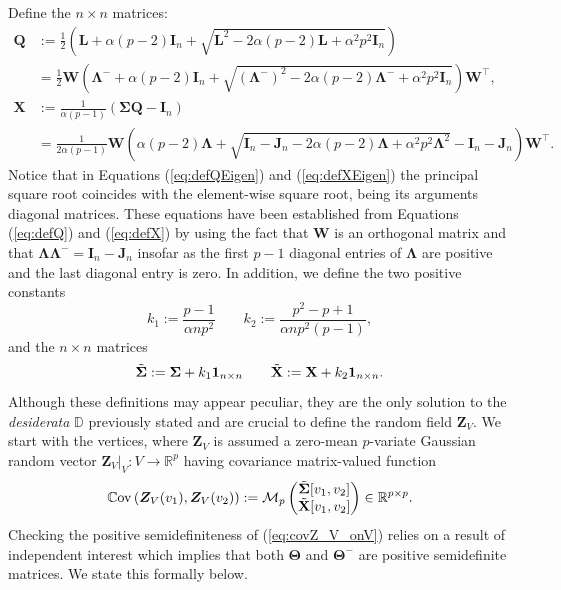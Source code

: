 \documentclass[12pt]{article}
\theoremstyle{plain}
\theoremstyle{remark}
\newcommand{\round}[1]{\left( #1 \right)}
\newcommand{\Cov}[2]{\mathbb{C}{\rm ov}\round{#1,#2}}
\newcommand{\R}[0]{\mathbb{R}}
\newcommand{\Mv}[3]{\mathcal{M}_{#1}\begin{pmatrix}
	#2\\
	#3
\end{pmatrix}}
\newcommand{\onenn}[0]{{\mathbf{1}_{n\times n}}}
\newcommand{\latMatr}[1]{\mathbf{#1}}          %
\newcommand{\grMatr}[1]{{\boldsymbol{#1}}}   %
\newcommand{\rVec}[1]{{\bm{#1}}}            %
\begin{document}
    Define the $n\times n$ matrices:
    \begin{align}
        \label{eq:defQ}
        \latMatr{Q}&:=\frac{1}{2} \round{{\latMatr{L}}+\alpha(p-2){\latMatr{I}_n}+\sqrt{\latMatr{L}^2-2\alpha (p-2){\latMatr{L}}+\alpha^2 p^2 {\latMatr{I}_n}}}\\
        \label{eq:defQEigen}
        &=\frac{1}{2} {\latMatr{W}} \round{{\grMatr{\Lambda}}^-+\alpha(p-2){\latMatr{I}_n}+\sqrt{({\grMatr{\Lambda}}^{-})^2-2\alpha(p-2){\grMatr{\Lambda}}^-+\alpha^2 p^2 {\latMatr{I}_n}}} {\latMatr{W}}^\top,\\
        \label{eq:defX}
        {\latMatr{X}}&:=\frac{1}{\alpha(p-1)}\round{{\grMatr{\Sigma}} \latMatr{Q} - {\latMatr{I}_n}}\\
        \label{eq:defXEigen}
        &=\frac{1}{2\alpha (p-1)} {\latMatr{W}} \round{\alpha(p-2){\grMatr{\Lambda}} + \sqrt{{\latMatr{I}_n - \latMatr{J}_n} - 2 \alpha (p-2){\grMatr{\Lambda}} + \alpha^2 p^2 {\grMatr{\Lambda}}^2} -{\latMatr{I}_n}-\latMatr{J}_n} {\latMatr{W}}^\top.
    \end{align}
    Notice that in Equations (\ref{eq:defQEigen}) and (\ref{eq:defXEigen}) the principal square root coincides with the element-wise square root, being its arguments diagonal matrices. {These equations have been established from Equations (\ref{eq:defQ}) and (\ref{eq:defX}) by using the fact that $\latMatr{W}$ is an orthogonal matrix and that $\grMatr{\Lambda} \grMatr{\Lambda}^- = \latMatr{I}_n - \latMatr{J}_n$ insofar as the first $p-1$ diagonal entries of $\grMatr{\Lambda}$ are positive and the last diagonal entry is zero.} 
    In addition, we define the two positive constants
    \begin{equation*}
        k_1 := \frac{p-1}{\alpha n p^2} \qquad k_2 := \frac{p^2-p+1}{\alpha n p^2(p-1)},
    \end{equation*} 
    and the $n \times n$ matrices 
    \begin{equation*}
        \Tilde {\grMatr{\Sigma}} := {\grMatr{\Sigma}} + k_1 \onenn \qquad
        \Tilde {\latMatr{X}} := {\latMatr{X}} + k_2 \onenn.
    \end{equation*}
    Although these definitions may appear {peculiar}, they are the only solution to the \emph{desiderata} $\mathbb D$ previously stated and are crucial to define the random field $\rVec{Z}_V$. We start with the vertices, where  $\rVec{Z}_V$ is assumed a zero-mean $p$-variate Gaussian random vector $\rVec{Z}_V\big|_V:V\to \R^p$ having covariance matrix-valued function
    \begin{equation}
        \label{eq:covZ_V_onV}
        \Cov{\rVec{Z}_V(v_1)}{\rVec{Z}_V(v_2)}:=\Mv{p}{\Tilde {\grMatr{\Sigma}}[v_1, v_2]}{\Tilde {\latMatr{X}}[v_1, v_2]} \in \R^{p \times p}.
    \end{equation}
    Checking the positive semidefiniteness of  (\ref{eq:covZ_V_onV}) %
    relies on a result of independent interest which implies that both $\grMatr \Theta$ and $\grMatr \Theta^-$ are positive semidefinite matrices. We state this formally below.
\end{document}
